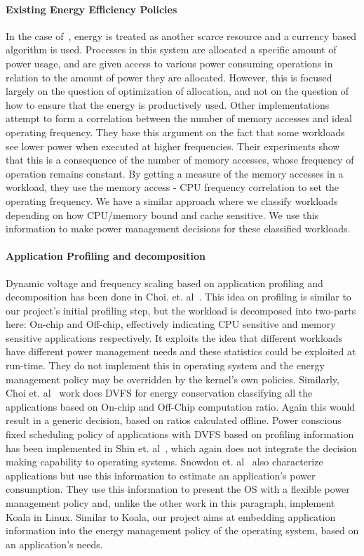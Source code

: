 \paragraph{Existing Energy Efficiency Policies} In the case of~\cite{ecos}, energy is treated as another scarce resource and a currency based algorithm is used. 
Processes in this system are allocated a specific amount of power usage, and are given access to various power consuming operations in relation to the amount 
of power they are allocated. However, this is focused largely on the question of optimization of allocation, and not on the question of how to ensure that the energy is productively used.
Other implementations~\cite{and-dvfs, decomp} attempt to form a correlation between the number of memory accesses and ideal operating frequency. They base this 
argument on the fact that some workloads see lower power when executed at higher frequencies. Their experiments show that this is a consequence of the 
number of memory accesses, whose frequency of operation remains constant. By getting a measure of the memory accesses in a workload, 
they use the memory access - CPU frequency correlation to set the operating frequency.
We have a similar approach where we classify workloads depending on how CPU/memory bound and cache sensitive. 
We use this information to make power management decisions for these classified workloads. 

\paragraph{Application Profiling and decomposition} Dynamic voltage and frequency scaling based on application profiling and 
decomposition has been done in Choi. et. al~\cite{decomp}. This idea on profiling is similar to our project’s initial profiling step, but the workload 
is decomposed into two-parts here: On-chip and Off-chip, effectively indicating CPU sensitive and memory sensitive applications respectively. 
It exploits the idea that different workloads have different power management needs and these statistics could be exploited 
at run-time. They do not implement this in operating system and the energy management policy  
may be overridden by the kernel's own policies. Similarly, Choi et. al~\cite{choi2005fine} work does DVFS for energy conservation 
classifying all the applications based on On-chip and Off-Chip computation ratio. Again this would result in a generic decision, based on ratios calculated offline. 
Power conscious fixed scheduling policy of applications with DVFS based on profiling information has been implemented in Shin et. al~\cite{shin1999power}, 
which again does not integrate the decision making capability to operating systems. 
Snowdon et. al~\cite{snowdon2009koala} also characterize applications but use this information to estimate an application's power consumption. 
They use this information to present the OS with a flexible power management policy and, unlike the other work in this paragraph, implement Koala in Linux.
Similar to Koala, our project aims at embedding application information into the energy management policy of the operating system, based on an application's needs. 
